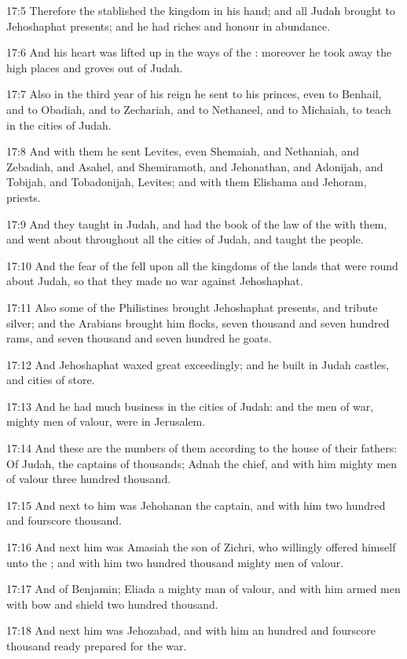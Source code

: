 17:5 Therefore the \LORD stablished the kingdom in his hand; and all Judah brought to Jehoshaphat presents; and he had riches and honour in abundance.

17:6 And his heart was lifted up in the ways of the \LORD: moreover he took away the high places and groves out of Judah.

17:7 Also in the third year of his reign he sent to his princes, even to Benhail, and to Obadiah, and to Zechariah, and to Nethaneel, and to Michaiah, to teach in the cities of Judah.

17:8 And with them he sent Levites, even Shemaiah, and Nethaniah, and Zebadiah, and Asahel, and Shemiramoth, and Jehonathan, and Adonijah, and Tobijah, and Tobadonijah, Levites; and with them Elishama and Jehoram, priests.

17:9 And they taught in Judah, and had the book of the law of the \LORD with them, and went about throughout all the cities of Judah, and taught the people.

17:10 And the fear of the \LORD fell upon all the kingdoms of the lands that were round about Judah, so that they made no war against Jehoshaphat.

17:11 Also some of the Philistines brought Jehoshaphat presents, and tribute silver; and the Arabians brought him flocks, seven thousand and seven hundred rams, and seven thousand and seven hundred he goats.

17:12 And Jehoshaphat waxed great exceedingly; and he built in Judah castles, and cities of store.

17:13 And he had much business in the cities of Judah: and the men of war, mighty men of valour, were in Jerusalem.

17:14 And these are the numbers of them according to the house of their fathers: Of Judah, the captains of thousands; Adnah the chief, and with him mighty men of valour three hundred thousand.

17:15 And next to him was Jehohanan the captain, and with him two hundred and fourscore thousand.

17:16 And next him was Amasiah the son of Zichri, who willingly offered himself unto the \LORD; and with him two hundred thousand mighty men of valour.

17:17 And of Benjamin; Eliada a mighty man of valour, and with him armed men with bow and shield two hundred thousand.

17:18 And next him was Jehozabad, and with him an hundred and fourscore thousand ready prepared for the war.

